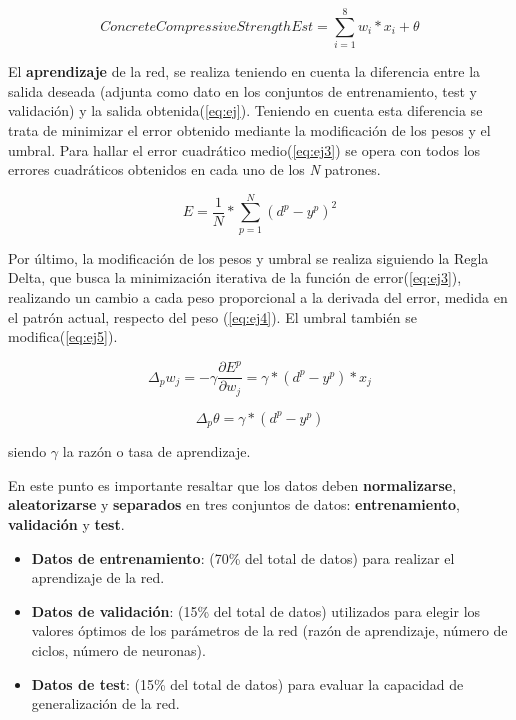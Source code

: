 \documentclass[11pt,spanish,listoffigures,listoftables]{tfgetsinf}
\begin{document}
\begin{equation}\label{eq:ej2}
ConcreteCompressiveStrengthEst = \sum_{i=1}^{8}w_{i}*x_{i} + \theta
\end{equation}

\par El \textbf{aprendizaje} de la red, se realiza teniendo en cuenta la diferencia entre la salida deseada (adjunta como dato en los conjuntos de entrenamiento, test y validación) y la salida obtenida(\ref{eq:ej}). Teniendo en cuenta esta diferencia se trata de minimizar el error obtenido mediante la modificación de los pesos y el umbral. Para hallar el error cuadrático medio(\ref{eq:ej3}) se opera con todos los errores cuadráticos obtenidos en cada uno de los \textit{N} patrones. 

\begin{equation}\label{eq:ej3}
E = \frac{1}{N}* \sum_{p=1}^{N}(d^{p} - y^{p})^{2}
\end{equation}

\par Por último, la modificación de los pesos y umbral se realiza siguiendo la Regla Delta, que busca la minimización iterativa de la función de error(\ref{eq:ej3}), realizando un cambio a cada peso proporcional a la derivada del error, medida en el patrón actual, respecto del peso (\ref{eq:ej4}). El umbral también se modifica(\ref{eq:ej5}).

\begin{equation}\label{eq:ej4}
\Delta_{p}w_{j} = -\gamma\frac{\partial E^{p}}{\partial w_{j}} = \gamma*(d^{p} - y^{p})*x_{j}
\end{equation} 

\begin{equation}\label{eq:ej5}
\Delta_{p}\theta = \gamma*(d^{p} - y^{p})
\end{equation}

\par siendo $\gamma$ la razón o tasa de aprendizaje.

\par En este punto es importante resaltar que los datos deben \textbf{normalizarse}, \textbf{aleatorizarse} y \textbf{separados} en tres conjuntos de datos: \textbf{entrenamiento}, \textbf{validación} y \textbf{test}.

\begin{itemize}
\item \textbf{Datos de entrenamiento}: (70\%  del  total  de  datos) para  realizar  el aprendizaje de la red. 
\item \textbf{Datos de validación}: (15\%  del  total  de  datos) utilizados para elegir los  valores  óptimos  de los parámetros  de  la  red  (razón  de aprendizaje, número de ciclos, número de neuronas).
\item \textbf{Datos de test}: (15\%  del  total  de  datos) para evaluar la capacidad de generalización de la red.
\end{itemize}
\end{document}
